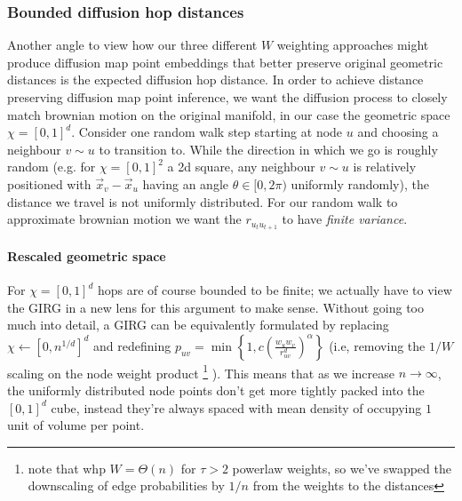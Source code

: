 \subsubsection{Bounded diffusion hop distances}
Another angle to view how our three different $W$ weighting approaches might produce diffusion map point embeddings that better preserve original geometric distances is the expected diffusion hop distance. In order to achieve distance preserving diffusion map point inference, we want the diffusion process to closely match brownian motion on the original manifold, in our case the geometric space $\chi = [0,1]^d$. Consider one random walk step starting at node $u$ and choosing a neighbour $v \sim u$ to transition to. While the direction in which we go is roughly random (e.g. for $\chi=[0,1]^2$ a 2d square, any neighbour $v \sim u$ is relatively positioned with $\vec{x}_v - \vec{x}_u$ having an angle $\theta \in [0, 2\pi)$ uniformly randomly), the distance we travel is not uniformly distributed. For our random walk to approximate brownian motion we want the  $r_{u_t u_{t+1}}$ to have \textit{finite variance}. 

\paragraph{Rescaled geometric space}
For $\chi = [0,1]^d$ hops are of course bounded to be finite; we actually have to view the GIRG in a new lens for this argument to make sense.
Without going too much into detail, a GIRG can be equivalently formulated by replacing $\chi \gets [0, n^{1/d}]^d$ and redefining $p_{uv} = \min \left \{ 1, c \left ( \frac{w_u w_v}{r_{uv}^d} \right )^\alpha \right \}$ (i.e, removing the $1/W$ scaling on the node weight product
  \footnote{note that whp $W = \Theta(n)$ for $\tau > 2$ powerlaw weights, so we've swapped the downscaling of edge probabilities by $1/n$ from the weights to the distances}
).
This means that as we increase $n \to \infty$, the uniformly distributed node points don't get more tightly packed into the $[0, 1]^d$ cube, instead they're always spaced with mean density of occupying $1$ unit of volume per point.


